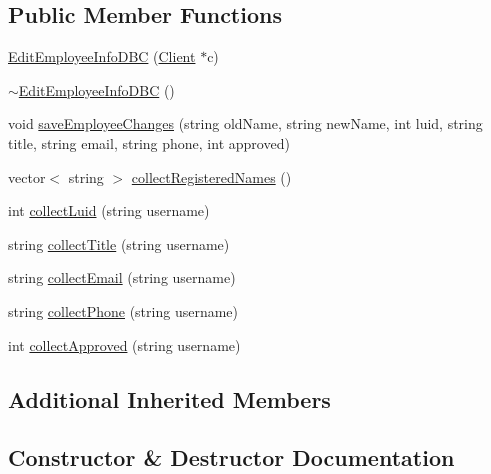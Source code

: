 \subsection*{Public Member Functions}
\begin{DoxyCompactItemize}
\item 
\hyperlink{class_edit_employee_info_d_b_c_a076627bf307a8ab914c1bd5ab82058fa}{Edit\+Employee\+Info\+D\+B\+C} (\hyperlink{class_client}{Client} $\ast$c)
\item 
\hyperlink{class_edit_employee_info_d_b_c_a2acbc0fbfd382ed311830fa4cf2cd4e5}{$\sim$\+Edit\+Employee\+Info\+D\+B\+C} ()
\item 
void \hyperlink{class_edit_employee_info_d_b_c_a35d00079da2e2eb76b3da61279876cc1}{save\+Employee\+Changes} (string old\+Name, string new\+Name, int luid, string title, string email, string phone, int approved)
\item 
vector$<$ string $>$ \hyperlink{class_edit_employee_info_d_b_c_a332b3f49b8ef64022c3a631bbb2cc09b}{collect\+Registered\+Names} ()
\item 
int \hyperlink{class_edit_employee_info_d_b_c_a30a8b91291851f44262a2100828a40e3}{collect\+Luid} (string username)
\item 
string \hyperlink{class_edit_employee_info_d_b_c_a0080a80bd06e5fd75d9efa02f1c7e5f5}{collect\+Title} (string username)
\item 
string \hyperlink{class_edit_employee_info_d_b_c_a67aca8d21b57cf97624f5daa18733ad8}{collect\+Email} (string username)
\item 
string \hyperlink{class_edit_employee_info_d_b_c_aaa47af8cd27238961404fac7375e4522}{collect\+Phone} (string username)
\item 
int \hyperlink{class_edit_employee_info_d_b_c_a9abf26b3fde851af4f6a1e47e327af27}{collect\+Approved} (string username)
\end{DoxyCompactItemize}
\subsection*{Additional Inherited Members}


\subsection{Constructor \& Destructor Documentation}
\hypertarget{class_edit_employee_info_d_b_c_a076627bf307a8ab914c1bd5ab82058fa}{}
